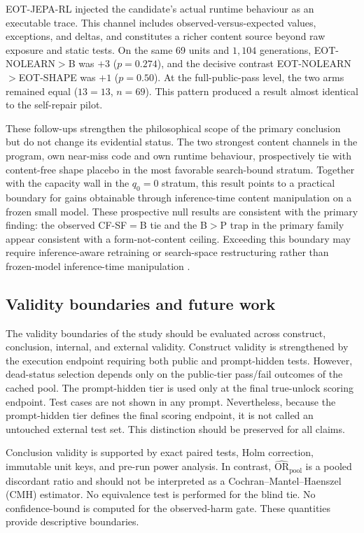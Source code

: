 \documentclass{article}
\numberwithin{equation}{section}  %
\theoremstyle{definition}
\newcommand{\armP}{\textsf{P}}
\newcommand{\armB}{\textsf{B}}
\newcommand{\armCF}{\textsf{CF-SF}}
\begin{document}
EOT-JEPA-RL injected the candidate's actual runtime behaviour as an executable trace. This
channel includes observed-versus-expected values, exceptions, and deltas, and constitutes a
richer content source beyond raw exposure and static tests. On the same 69 units and
$1{,}104$ generations, EOT-NOLEARN$>$\armB{} was $+3$ ($p{=}0.274$), and the decisive
contrast EOT-NOLEARN$>$EOT-SHAPE was $+1$ ($p{=}0.50$). At the full-public-pass level, the
two arms remained equal ($13{=}13$, $n{=}69$). This pattern produced a result almost
identical to the self-repair pilot.

These follow-ups strengthen the philosophical scope of the primary conclusion but do not
change its evidential status. The two strongest content channels in the program, own
near-miss code and own runtime behaviour, prospectively tie with content-free shape placebo
in the most favorable search-bound stratum. Together with the capacity wall in the $q_0{=}0$
stratum, this result points to a practical boundary for gains obtainable through
inference-time content manipulation on a frozen small model. These prospective null results
are consistent with the primary finding: the observed \armCF{}${=}$\armB{} tie and the
\armB{}$>$\armP{} trap in the primary family appear consistent with a form-not-content
ceiling. Exceeding this boundary may require inference-aware retraining or search-space
restructuring rather than frozen-model inference-time manipulation
\citep{chow2025inferenceaware,ding2024cycle}.

\subsection{Validity boundaries and future work}
\label{sec:boundaries}

The validity boundaries of the study should be evaluated across construct, conclusion,
internal, and external validity. Construct validity is strengthened by the execution endpoint
requiring both public and prompt-hidden tests. However, dead-status selection depends only on
the public-tier pass/fail outcomes of the cached pool. The prompt-hidden tier is used only at
the final true-unlock scoring endpoint. Test cases are not shown in any prompt. Nevertheless,
because the prompt-hidden tier defines the final scoring endpoint, it is not called an
untouched external test set. This distinction should be preserved for all claims.

Conclusion validity is supported by exact paired tests, Holm correction, immutable unit keys,
and pre-run power analysis. In contrast, $\widehat{\mathrm{OR}}_{\mathrm{pool}}$ is a pooled
discordant ratio and should not be interpreted as a Cochran--Mantel--Haenszel (CMH) estimator.
No equivalence test is performed for the blind tie. No confidence-bound is computed for the
observed-harm gate. These quantities provide descriptive boundaries.
\end{document}
